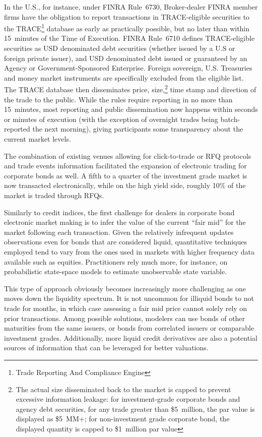 In the U.S., for instance, under FINRA Rule~6730, Broker-dealer FINRA member firms have the obligation to report transactions in TRACE-eligible securities to the TRACE\footnote{Trade Reporting And Compliance Engine} database as early as practically possible, but no later than within 15~minutes of the Time of Execution. FINRA Rule~6710 defines TRACE-eligible securities as USD denominated debt securities (whether issued by a U.S or foreign private issuer), and USD denominated debt issued or guaranteed by an Agency or Government-Sponsored Enterprise. Foreign sovereign, U.S. Treasuries and money market instruments are specifically excluded from the eligible list. The TRACE database then disseminates price, size,\footnote{The actual size disseminated back to the market is capped to prevent excessive information leakage: for investment-grade corporate bonds and agency debt securities, for any trade greater than \$5~million, the par value is displayed as \$5~MM$+$; for non-investment grade corporate bond, the displayed quantity is capped to \$1~million par value} time stamp and direction of the trade to the public. While the rules require reporting in no more than 15~minutes, most reporting and public dissemination now happens within seconds or minutes of execution (with the exception of overnight trades being batch-reported the next morning), giving participants some transparency about the current market levels.


The combination of existing venues allowing for click-to-trade or RFQ protocols and trade events information facilitated the expansion of electronic trading for corporate bonds as well. A fifth to a quarter of the investment grade market is now transacted electronically, while on the high yield side, roughly 10\% of the market is traded through RFQs.


Similarly to credit indices, the first challenge for dealers in corporate bond electronic market making is to infer the value of the current ``fair mid'' for the market following each transaction. Given the relatively infrequent updates observations even for bonds that are considered liquid, quantitative techniques employed tend to vary from the ones used in markets with higher frequency data available such as equities. Practitioners rely much more, for instance, on probabilistic state-space models to estimate unobservable state variable.


This type of approach obviously becomes increasingly more challenging as one moves down the liquidity spectrum. It is not uncommon for illiquid bonds to not trade for months, in which case assessing a fair mid price cannot solely rely on prior transactions. Among possible solutions, modelers can use bonds of other maturities from the same issuers, or bonds from correlated issuers or comparable investment grades. Additionally, more liquid credit derivatives are also a potential sources of information that can be leveraged for better valuations. 



